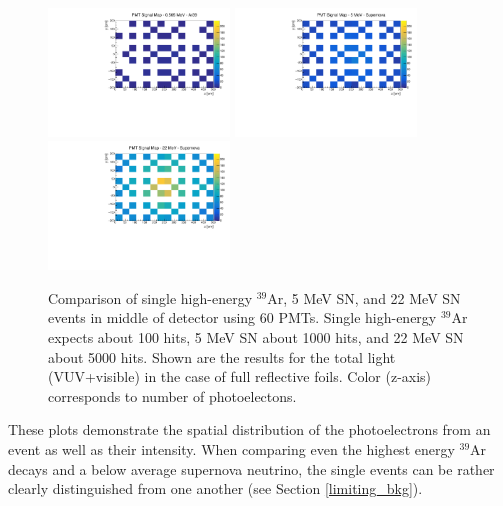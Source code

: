 \documentclass[a4paper]{article}
\begin{document}
	\begin{figure}[H]
	\center
      \includegraphics[width=0.43\textwidth]{pmt_maps_ar.pdf}
      \includegraphics[width=0.43\textwidth]{pmt_maps_5_supernova.pdf}
      \includegraphics[width=0.43\textwidth]{pmt_maps_22_supernova.pdf}
	\caption{Comparison of single high-energy $^{39}$Ar, 5 MeV SN, and 22 MeV SN events in middle of detector using 60 PMTs. Single high-energy $^{39}$Ar expects about 100 hits, 5 MeV SN about 1000 hits, and 22 MeV SN about 5000 hits. Shown are the results for the total light (VUV+visible) in the case of full reflective foils. Color (z-axis) corresponds to number of photoelectons.}\label{pmt_maps}
	\end{figure}

These plots demonstrate the spatial distribution of the photoelectrons from an event as well as their intensity. When comparing even the highest energy $^{39}$Ar decays and a below average supernova neutrino, the single events can be rather clearly distinguished from one another (see Section \ref{limiting_bkg}).
\end{document}
